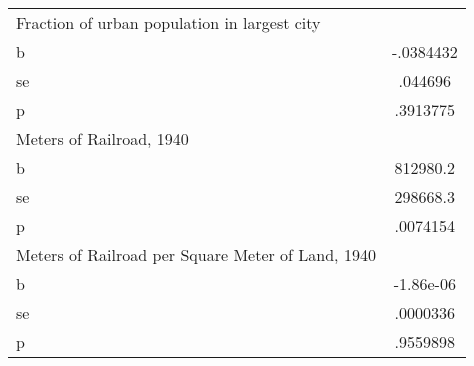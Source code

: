 \begin{tabular}{l*{1}{c}}
\midrule
Fraction of urban population in largest city&         \\
b               &-.0384432\\
se              &  .044696\\
p               & .3913775\\
\midrule
Meters of Railroad, 1940&         \\
b               & 812980.2\\
se              & 298668.3\\
p               & .0074154\\
\midrule
Meters of Railroad per Square Meter of Land, 1940&         \\
b               &-1.86e-06\\
se              & .0000336\\
p               & .9559898\\
\bottomrule
\end{tabular}
